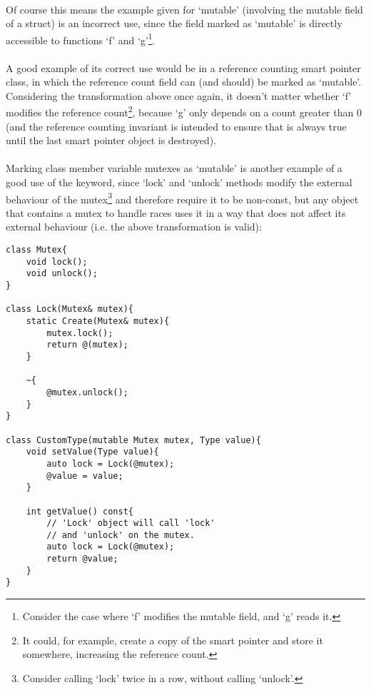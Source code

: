 \documentclass[12pt,twoside,notitlepage]{report}
\begin{document}
\paragraph{}
Of course this means the example given for `mutable' (involving the mutable field of a struct) is an incorrect use, since the field marked as `mutable' is directly accessible to functions `f' and `g'\footnote{Consider the case where `f' modifies the mutable field, and `g' reads it.}.

\paragraph{}
A good example of its correct use would be in a reference counting smart pointer class, in which the reference count field can (and should) be marked as `mutable'. Considering the transformation above once again, it doesn't matter whether `f' modifies the reference count\footnote{It could, for example, create a copy of the smart pointer and store it somewhere, increasing the reference count.}, because `g' only depends on a count greater than 0 (and the reference counting invariant is intended to ensure that is always true until the last smart pointer object is destroyed).

\paragraph{}
Marking class member variable mutexes as `mutable' is another example of a good use of the keyword, since `lock' and `unlock' methods modify the external behaviour of the mutex\footnote{Consider calling `lock' twice in a row, without calling `unlock'.} and therefore require it to be non-const, but any object that contains a mutex to handle races uses it in a way that does not affect its external behaviour (i.e. the above transformation is valid):

\begin{lstlisting}
class Mutex{
	void lock();
	void unlock();
}

class Lock(Mutex& mutex){
	static Create(Mutex& mutex){
		mutex.lock();
		return @(mutex);
	}
	
	~{
		@mutex.unlock();
	}
}

class CustomType(mutable Mutex mutex, Type value){
	void setValue(Type value){
		auto lock = Lock(@mutex);
		@value = value;
	}

	int getValue() const{
		// 'Lock' object will call 'lock'
		// and 'unlock' on the mutex.
		auto lock = Lock(@mutex);
		return @value;
	}
}
\end{lstlisting}
\end{document}
